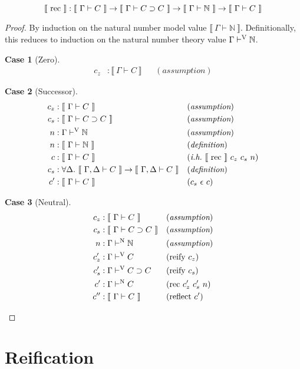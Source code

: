 \documentclass{llncs}
\newtheorem{scase}{Case}
\def\arr{\supset}
\def\marr{\rightarrow}
\def\nat{\mathbb{N}}
\def\emp{\epsilon}
\def\bydef{(\textit{definition})}
\def\byass{(\textit{assumption})}
\newcommand{\ih}[1]{(\textit{i.h.}~ #1)}
\newcommand{\by}[1]{(#1)}
\newcommand{\turn}[1]{\vdash^\con{#1}}
\newcommand{\all}[1]{\forall#1.~}
\newcommand{\el}[1]{\llbracket ~ #1 ~ \rrbracket}
\newcommand{\con}[1]{\textmd{#1}}
\newcommand{\fun}[1]{\textmd{#1}}
\newcommand{\typm}[1]{\el{\Gamma \vdash #1}}
\newcommand{\gdtypm}[1]{\el{\Gamma, \Delta \vdash #1}}
\newcommand{\typv}[1]{\Gamma \turn{V} #1}
\newcommand{\typn}[1]{\Gamma \turn{N} #1}
\begin{document}
\begin{lemma}
\label{lem:mod:rec}
$$
\el{\fun{rec}} : \typm{C} \marr \typm{C \arr C} \marr \typm{\nat} \marr \typm{C}
$$

\begin{proof}

By induction on the natural number model value $\typm{\nat}$.
Definitionally, this reduces to induction on the natural number theory
value $\typv{\nat}$.

\begin{scase}[Zero]
\begin{align*}
c_z  &: \typm{C} && \byass
\end{align*}
\end{scase}

\begin{scase}[Successor]
\begin{align*}
c_z  &: \typm{C} && \byass\\
c_s  &: \typm{C \arr C} && \byass\\
n    &: \typv{\nat} && \byass\\
n    &: \typm{\nat} && \bydef\\
c    &: \typm{C} && \ih{\el{\fun{rec}}~c_z~c_s~n}\\
c_s  &: \all{\Delta} \gdtypm{C} \marr \gdtypm{C} && \bydef\\
c'   &: \typm{C} && \by{c_s~\emp~c}
\end{align*}
\end{scase}

\begin{scase}[Neutral]
\begin{align*}
c_z  &: \typm{C} && \byass\\
c_s  &: \typm{C \arr C} && \byass\\
n    &: \typn{\nat} && \byass\\
c_z' &: \typv{C} && \by{\fun{reify}~c_z}\\
c_s' &: \typv{C \arr C} && \by{\fun{reify}~c_s}\\
c'   &: \typn{C} && \by{\fun{rec}~c_z'~c_s'~n}\\
c''  &: \typm{C} && \by{\fun{reflect}~c'}
\end{align*}
\end{scase}

\end{proof}

\end{lemma}

\section{Reification}
\end{document}
